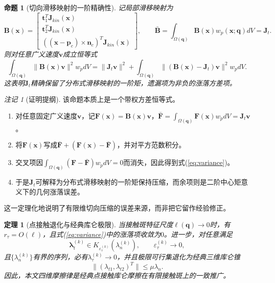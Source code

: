 ﻿\documentclass[12pt, a4paper]{ctexart}
\theoremstyle{plain}
\newtheorem{proposition}{命题}
\newtheorem{theorem}{定理}
\theoremstyle{remark}
\newtheorem{remark}{注记}
\begin{document}
\begin{proposition}[切向滑移映射的一阶精确性]\label{prop:variance}
记局部滑移映射为
\begin{equation}
    \bm{B}(\bm{x}) =
    \begin{bmatrix}
        \bm{t}_1^T \bm{J}_{kin}(\bm{x}) \\
        \bm{t}_2^T \bm{J}_{kin}(\bm{x}) \\
        ((\bm{x} - \bm{p}_c) \times \bm{n}_c)^T \bm{J}_{kin}(\bm{x})
    \end{bmatrix},
    \qquad
    \bar{\bm{B}} = \int_{\Omega(\bm{q})} \bm{B}(\bm{x}) w_p(\bm{x};\bm{q}) dV = \bm{J}_t.
\end{equation}
则对任意广义速度$\bm{v}$成立恒等式
\begin{equation}\label{eq:variance}
    \int_{\Omega(\bm{q})} \| \bm{B}(\bm{x}) \bm{v} \|^2 w_p dV
    =
    \| \bm{J}_t \bm{v} \|^2
    +
    \int_{\Omega(\bm{q})} \| (\bm{B}(\bm{x}) - \bm{J}_t) \bm{v} \|^2 w_p dV .
\end{equation}
这表明$\bm{J}_t$精确保留了分布式滑移映射的一阶矩，遗漏项为非负的涨落方差项。
\end{proposition}

\begin{remark}[证明提纲]
该命题本质上是一个带权方差恒等式。
\begin{enumerate}
    \item 对任意固定广义速度$\bm{v}$，记$\bm{F}(\bm{x}) = \bm{B}(\bm{x}) \bm{v}$，$\bar{\bm{F}} = \int_{\Omega(\bm{q})} \bm{F}(\bm{x}) w_p dV = \bm{J}_t \bm{v}$。
    \item 将$\bm{F}(\bm{x})$写成$\bar{\bm{F}} + (\bm{F}(\bm{x}) - \bar{\bm{F}})$，并对平方范数积分。
    \item 交叉项因$\int_{\Omega(\bm{q})} (\bm{F} - \bar{\bm{F}}) w_p dV = 0$而消失，因此得到式(\ref{eq:variance})。
    \item 于是$\bm{J}_t$可解释为分布式滑移映射的一阶矩保持压缩，而余项则是二阶中心矩意义下的几何涨落误差。
\end{enumerate}
这一定理化地说明了有限维切向压缩的误差来源，而非把它留作经验修正。
\end{remark}

\begin{theorem}[点接触退化与经典库仑极限]\label{thm:degenerate}
当接触斑特征尺度$\ell(\bm{q}) \to 0$时，有$r_{\tau} = O(\ell)$，且式(\ref{eq:variance})中的涨落项收敛为$0$。进一步，对任意满足
\begin{equation}
    \bm{\lambda}_t^{(k)} \in K_{\varepsilon_{\tau}^{(k)}}(\lambda_n^{(k)}),
    \qquad
    \varepsilon_{\tau}^{(k)} \to 0,
\end{equation}
且$\{\lambda_n^{(k)}\}$有界的序列，必有$\lambda_{\tau}^{(k)} \to 0$，并且极限可行集退化为经典三维库仑锥
\begin{equation}
    \| (\lambda_{t1}, \lambda_{t2})^T \| \le \mu \lambda_n .
\end{equation}
因此，本文四维摩擦律是经典点接触库仑摩擦在有限接触斑上的一致推广。
\end{theorem}
\end{document}
